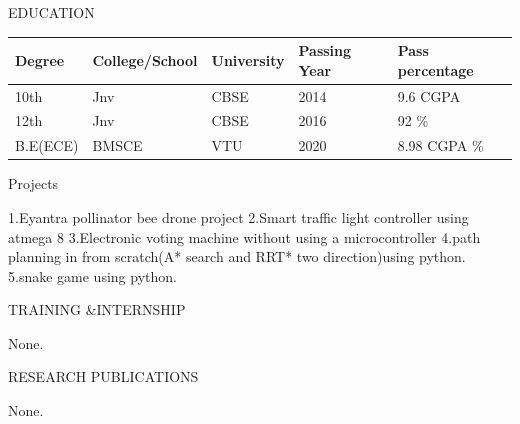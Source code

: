 \documentclass[10pt]{article}
\begin{document}
	\begin{minipage}[t][2cm][t]{0.2\textwidth}
	EDUCATION
		
	\end{minipage}
	\begin{minipage}[t][2cm][t]{0.8\textwidth}
		
	\begin{tabular}{ | l |  l |  l |  l |  l |} 
	\hline
	Degree & College/School & University & Passing Year & Pass percentage \\ 
	\hline
	\hline
	10th & Jnv & CBSE & 2014 & 9.6 CGPA  \\ 
\hline
12th & Jnv & CBSE & 2016 & 92 \%  \\ 
\hline
B.E(ECE) & BMSCE & VTU & 2020 & 8.98 CGPA \%  \\ 
\hline
	
	\end{tabular}
	\end{minipage}




	

	
	\begin{minipage}[t][2cm][t]{0.2\textwidth}
		Projects
		
	\end{minipage}
	\begin{minipage}[t][2cm][t]{0.8\textwidth}
		1.Eyantra pollinator bee drone project
		\newline 2.Smart traffic light controller using atmega 8
		\newline 3.Electronic voting machine without using a microcontroller
		\newline 4.path planning in from scratch(A* search and RRT* two direction)using python.
		\newline 5.snake game using python.
		
	\end{minipage}



	

	
	\begin{minipage}[t][2cm][t]{0.2\textwidth}
		TRAINING \&INTERNSHIP
		
	\end{minipage}
	\begin{minipage}[t][2cm][t]{0.8\textwidth}
		None.

	\end{minipage}
	
		

		
	\begin{minipage}[t][2cm][t]{0.2\textwidth}
		RESEARCH PUBLICATIONS
		
	\end{minipage}
	\begin{minipage}[t][2cm][t]{0.8\textwidth}
		None.
		
	\end{minipage}
\end{document}
